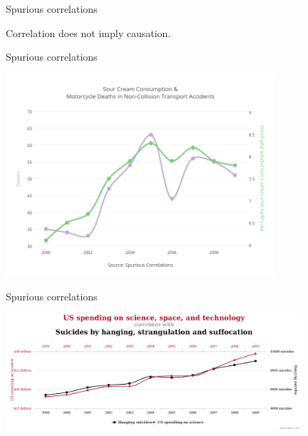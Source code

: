 \documentclass{beamer}
\begin{document}
\begin{frame}
{\centerline{Spurious correlations}}
\begin{center}
\LARGE
Correlation does not imply causation.
\end{center}
\end{frame}




\begin{frame}
{\centerline{Spurious correlations}}

\begin{center}
\includegraphics[width=10cm]{P2023.AIBCCSS.InferenceAndLogisticRegression/motor.png}
\end{center}

\end{frame}




\begin{frame}
{\centerline{Spurious correlations}}

\begin{center}
\includegraphics[width=11cm]{P2023.AIBCCSS.InferenceAndLogisticRegression/chart.png}
\end{center}


\end{frame}
\end{document}
